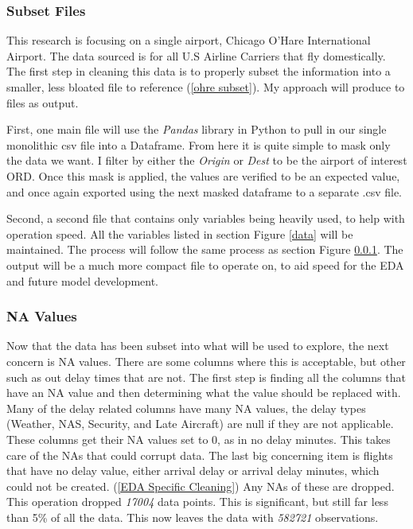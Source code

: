 \documentclass[a4paper,12pt]{article}
\begin{document}
\subsubsection{Subset Files} \label{datasubset}
This research is focusing on a single airport, Chicago O'Hare International Airport. The data sourced is for all U.S Airline Carriers that fly domestically.
The first step in cleaning this data is to properly subset the information into a smaller, less bloated file to reference (\ref{ohre subset}). My approach will produce to files as output.

First, one main file will use the \emph{Pandas} library in Python to pull in our single monolithic csv file into a Dataframe. From here it is quite simple to mask only the data we want.
I filter by either the \emph{Origin} or \emph{Dest} to be the airport of interest ORD.
Once this mask is applied, the values are verified to be an expected value, and once again exported using the next masked dataframe to a separate .csv file. 

Second, a second file that contains only variables being heavily used, to help with operation speed. All the variables listed in section Figure \ref{data} will be maintained.
The process will follow the same process as section Figure \ref{datasubset}. The output will be a much more compact file to operate on, to aid speed for the EDA and future model development.

\subsubsection{NA Values}
Now that the data has been subset into what will be used to explore, the next concern is NA values. There are some columns where this is acceptable, but other such as out delay times
that are not. The first step is finding all the columns that have an NA value and then determining what the value should be replaced with. Many of the delay related columns have many NA values,
the delay types (Weather, NAS, Security, and Late Aircraft) are null if they are not applicable. These columns get their NA values set to 0, as in no delay minutes. This takes care of the NAs that could corrupt data.
The last big concerning item is flights that have no delay value, either arrival delay or arrival delay minutes, which could not be created. (\ref{EDA Specific Cleaning}) Any NAs of these are dropped.
This operation dropped \emph{17004} data points. This is significant, but still far less than 5\% of all the data. This now leaves the data with \emph{582721} observations.
\end{document}

